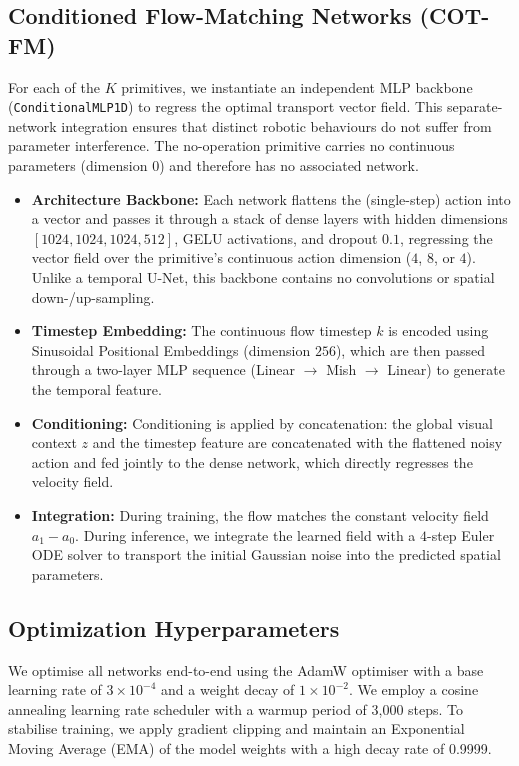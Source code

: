 \documentclass[journal]{IEEEtran}
\begin{document}
\subsection{Conditioned Flow-Matching Networks (COT-FM)}
For each of the $K$ primitives, we instantiate an independent MLP backbone (\texttt{ConditionalMLP1D}) to regress the optimal transport vector field. This separate-network integration ensures that distinct robotic behaviours do not suffer from parameter interference. The no-operation primitive carries no continuous parameters (dimension $0$) and therefore has no associated network.
\begin{itemize}
    \item \textbf{Architecture Backbone:} Each network flattens the (single-step) action into a vector and passes it through a stack of dense layers with hidden dimensions $[1024, 1024, 1024, 512]$, GELU activations, and dropout $0.1$, regressing the vector field over the primitive's continuous action dimension ($4$, $8$, or $4$). Unlike a temporal U-Net, this backbone contains no convolutions or spatial down-/up-sampling.
    \item \textbf{Timestep Embedding:} The continuous flow timestep $k$ is encoded using Sinusoidal Positional Embeddings (dimension $256$), which are then passed through a two-layer MLP sequence (Linear $\rightarrow$ Mish $\rightarrow$ Linear) to generate the temporal feature.
    \item \textbf{Conditioning:} Conditioning is applied by concatenation: the global visual context $z$ and the timestep feature are concatenated with the flattened noisy action and fed jointly to the dense network, which directly regresses the velocity field.
    \item \textbf{Integration:} During training, the flow matches the constant velocity field $a_1 - a_0$. During inference, we integrate the learned field with a $4$-step Euler ODE solver to transport the initial Gaussian noise into the predicted spatial parameters.
\end{itemize}

\subsection{Optimization Hyperparameters}
We optimise all networks end-to-end using the AdamW optimiser with a base learning rate of $3 \times 10^{-4}$ and a weight decay of $1 \times 10^{-2}$. We employ a cosine annealing learning rate scheduler with a warmup period of 3,000 steps. To stabilise training, we apply gradient clipping and maintain an Exponential Moving Average (EMA) of the model weights with a high decay rate of 0.9999.
\end{document}
